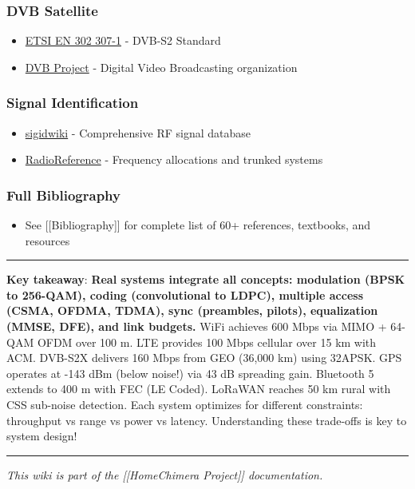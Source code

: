 \subsubsection{DVB Satellite}\label{dvb-satellite}

\begin{itemize}
\tightlist
\item
  \href{https://www.etsi.org/deliver/etsi_en/302300_302399/30230701/}{ETSI
  EN 302 307-1} - DVB-S2 Standard
\item
  \href{https://www.dvb.org/}{DVB Project} - Digital Video Broadcasting
  organization
\end{itemize}

\subsubsection{Signal Identification}\label{signal-identification}

\begin{itemize}
\tightlist
\item
  \href{https://www.sigidwiki.com/wiki/Signal_Identification_Guide}{sigidwiki}
  - Comprehensive RF signal database
\item
  \href{https://www.radioreference.com/}{RadioReference} - Frequency
  allocations and trunked systems
\end{itemize}

\subsubsection{Full Bibliography}\label{full-bibliography}

\begin{itemize}
\tightlist
\item
  See {[}{[}Bibliography{]}{]} for complete list of 60+ references,
  textbooks, and resources
\end{itemize}

\begin{center}\rule{0.5\linewidth}{0.5pt}\end{center}

\textbf{Key takeaway}: \textbf{Real systems integrate all concepts:
modulation (BPSK to 256-QAM), coding (convolutional to LDPC), multiple
access (CSMA, OFDMA, TDMA), sync (preambles, pilots), equalization
(MMSE, DFE), and link budgets.} WiFi achieves 600 Mbps via MIMO + 64-QAM
OFDM over 100 m. LTE provides 100 Mbps cellular over 15 km with ACM.
DVB-S2X delivers 160 Mbps from GEO (36,000 km) using 32APSK. GPS
operates at -143 dBm (below noise!) via 43 dB spreading gain. Bluetooth
5 extends to 400 m with FEC (LE Coded). LoRaWAN reaches 50 km rural with
CSS sub-noise detection. Each system optimizes for different
constraints: throughput vs range vs power vs latency. Understanding
these trade-offs is key to system design!

\begin{center}\rule{0.5\linewidth}{0.5pt}\end{center}

\emph{This wiki is part of the {[}{[}Home\textbar Chimera Project{]}{]}
documentation.}
